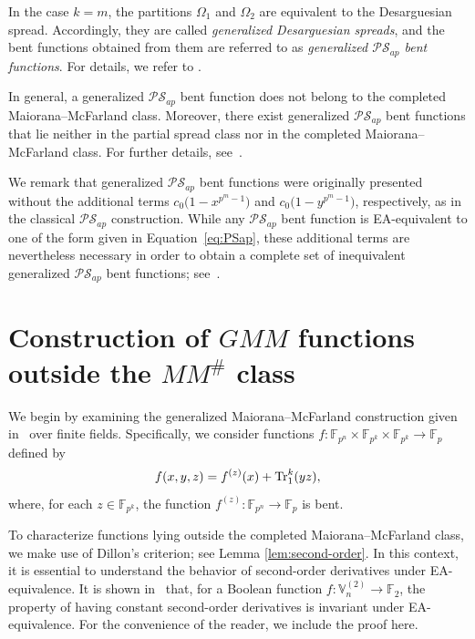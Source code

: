 \documentclass[12pt]{article}
\theoremstyle{plain}
\theoremstyle{definition}
\newcommand{\V}{\mathbb{V}}
\renewcommand{\to}{\rightarrow}
\newcommand{\Tr}{{\rm Tr}}
\begin{document}
	In the case \(k = m\), the partitions \(\Omega_1\) and \(\Omega_2\)
	are equivalent to the Desarguesian spread.
	Accordingly, they are called \emph{generalized Desarguesian spreads}, and the
	bent functions obtained from them are referred to as
	\emph{generalized \(\mathcal{PS}_{ap}\) bent functions}. For details, we refer to \cite{akm25,nuwi22}.
	
	In general, a generalized $\mathcal{PS}_{{ap}}$ bent function does not
	belong to the completed Maiorana--McFarland class. Moreover, there exist
	generalized $\mathcal{PS}_{{ap}}$ bent functions that lie neither in
	the partial spread class nor in the completed Maiorana--McFarland class.
	For further details, see~\cite[Examples~5.1 and~5.2]{akm23}.
	
	We remark that generalized \(\mathcal{PS}_{ap}\) bent functions were originally
	presented without the additional terms
	\(c_0 \bigl(1 - x^{p^{m}-1}\bigr)\) and
	\(c_0 \bigl(1 - y^{p^{m}-1}\bigr)\), respectively, as in the classical
	\(\mathcal{PS}_{ap}\) construction. While any \(\mathcal{PS}_{ap}\) bent
	function is EA-equivalent to one of the form given in
	Equation~\eqref{eq:PSap}, these additional terms are nevertheless necessary in
	order to obtain a complete set of inequivalent generalized
	\(\mathcal{PS}_{ap}\) bent functions; see~\cite[Example~1]{akm25}.
	
	\section{Construction of \(GMM\) functions outside the \(MM^{\#}\) class} \label{sec:MM}
	
	We begin by examining the generalized Maiorana--McFarland construction given in~\cite{cmpGMM}
	over finite fields.
	Specifically, we consider functions
	\(f : \mathbb{F}_{p^n} \times \mathbb{F}_{p^k} \times \mathbb{F}_{p^k}
	\to \mathbb{F}_p\) defined by
	\begin{equation}\label{GMM}
		f(x,y,z) = f^{(z)}(x) + \Tr_1^k(yz),
	\end{equation}
	where, for each \(z \in \mathbb{F}_{p^k}\), the function
	\(f^{(z)} : \mathbb{F}_{p^n} \to \mathbb{F}_p\) is bent.
	
	To characterize functions lying outside the completed Maiorana--McFarland
	class, we make use of Dillon's criterion; see Lemma \ref{lem:second-order}.
	In this context, it is essential to understand the behavior of second-order
	derivatives under EA-equivalence.
	It is shown in~\cite{akkmpp26} that, for a Boolean function
	\(f \colon \V_n^{(2)} \to \mathbb{F}_2\), the property of having constant
	second-order derivatives is invariant under EA-equivalence. For the convenience
	of the reader, we include the proof here.
	
\end{document}
